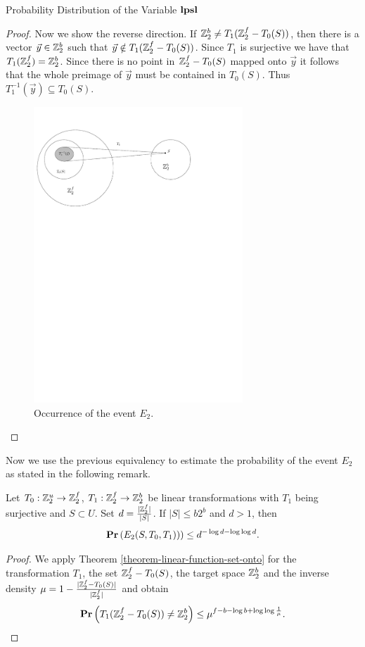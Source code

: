 \begin{section}{Probability Distribution of the Variable \texorpdfstring{$\mathbf{lpsl}$}{lpsl}}
\begin{proof}
Now we show the reverse direction. If $\mathbb{Z}_{2}^{b} \neq T_1(\mathbb{Z}_{2}^{f} - T_0(S))$, then there is a vector $\vec{y} \in \mathbb{Z}_{2}^{b}$ such that $\vec{y} \notin T_1(\mathbb{Z}_{2}^{f} - T_0(S))$. Since $T_1$ is surjective we have that $T_1(\mathbb{Z}_{2}^{f}) = \mathbb{Z}_{2}^{b}$. Since there is no point in $\mathbb{Z}_{2}^{f} - T_0(S)$ mapped onto $\vec{y}$ it follows that the whole preimage of $\vec{y}$ must be contained in $T_0(S)$. Thus $T_1^{-1}(\vec{y}) \subseteq T_0(S)$.

\begin{figure}
  \centering
    \includegraphics[width=0.7\textwidth]{images/e2}

  \caption{Occurrence of the event $E_2$.}
\end{figure}

\end{proof}

Now we use the previous equivalency to estimate the probability of the event $E_2$ as stated in the following remark. 
\begin{remark}
\label{remark-e2-probability}
Let $T_0: \mathbb{Z}_{2}^{u} \rightarrow \mathbb{Z}_{2}^{f}$, $T_1: \mathbb{Z}_{2}^{f} \rightarrow \mathbb{Z}_{2}^{b}$ be linear transformations with $T_1$ being surjective and $S \subset U$. Set $d = \frac{|\mathbb{Z}_{2}^{f}|}{|S|}$. If $|S| \leq b2 ^ b$ and $d > 1$, then 
\[
	\mathbf{Pr}\left(E_2(S, T_0, T_1))\right) \leq d^{-\log d - \log \log d} \text{.}
\]
\end{remark}
\begin{proof}
We apply Theorem \ref{theorem-linear-function-set-onto} for the transformation $T_1$, the set $\mathbb{Z}_{2}^{f} - T_0(S)$, the target space $\mathbb{Z}_{2}^{b}$ and the inverse density $\mu = 1 - \frac{|\mathbb{Z}_{2}^{f} - T_0(S)|}{|\mathbb{Z}_{2}^{f}|}$ and obtain
\[
	\mathbf{Pr}\left(T_1(\mathbb{Z}_{2}^{f} - T_0(S)) \neq \mathbb{Z}_{2}^{b}\right) \leq \mu ^ {f - b - \log b + \log \log \frac{1}{\mu}} \text{.}
\]


\end{proof}
\end{section}
